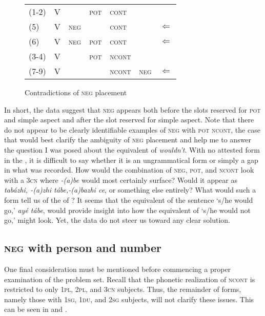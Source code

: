\documentclass[output=paper]{LSP/langsci}
\begin{document}
\begin{figure}
\caption{Contradictions of  \textsc{neg} placement} \label{contradictions}
\begin{tabular}{ l l l l l l l }
(1-2) & V & & \textsc{pot} & \textsc{cont} & & \\
(5) & V & \textsc{neg} & & \textsc{cont} & & $\Leftarrow$ \\
(6) & V & \textsc{neg} & \textsc{pot} & \textsc{cont} & & $\Leftarrow$ \\
(3-4) & V & & \textsc{pot} & \textsc{ncont} & & \\
(7-9) & V & & & \textsc{ncont} & \textsc{neg} & $\Leftarrow$ \\
\end{tabular}
\end{figure}

In short, the data suggest that \textsc{neg} appears both before the slots reserved for \textsc{pot} and simple aspect and after the slot reserved for simple aspect. Note that there do not appear to be clearly identifiable examples of \textsc{neg} with \textsc{pot ncont}, the case that would best clarify the ambiguity of  \textsc{neg} placement and help me to answer the question I was posed about the  equivalent of \textit{wouldn't}. With no attested form in the , it is difficult to say whether it is an ungrammatical form or simply a gap in what was recorded. How would the combination of \textsc{neg}, \textsc{pot}, and \textsc{ncont} look with a \textsc{3cn}  where \textit{-(a)be} would most certainly surface? Would it appear as \textit{tabázhi, -(a)zhi tábe,-(a)bazhi ce}, or something else entirely? What would such a form tell us of the  of  ? It seems that the  equivalent of the  sentence `s/he would go,' \textit{ay\'e tábe}, would provide insight into how the equivalent of `s/he would not go,' might look. Yet, the data do not steer us toward any clear solution.

\subsection{\textsc{neg} with person and number}
One final consideration must be mentioned before commencing a proper examination of the problem set. Recall that the phonetic realization of \textsc{ncont} is restricted to only \textsc{1pl, 2pl}, and \textsc{3cn} subjects. Thus, the remainder of forms, namely those with \textsc{1sg, 1du}, and \textsc{2sg} subjects, will not clarify these issues. This can be seen in  and .
\end{document}
